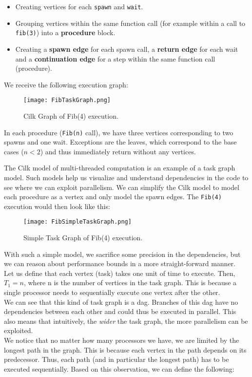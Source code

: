 \documentclass[main.tex]{subfiles}
\begin{document}
\begin{itemize}
  \item Creating vertices for each \texttt{spawn} and \texttt{wait}.
  \item Grouping vertices within the same function call (for example within a call to \texttt{fib(3)}) into a \textbf{procedure} block.
  \item Creating a \textbf{spawn edge} for each spawn call, a \textbf{return edge} for each wait and a \textbf{continuation edge} for a step within the same function call (procedure).
\end{itemize}

\noindent We receive the following execution graph:

\begin{figure}[H]
    \centering
    \texttt{[image: FibTaskGraph.png]}
    \caption{Cilk Graph of Fib(4) execution.}
\end{figure}

\noindent In each procedure (\texttt{Fib(n)} call), we have three vertices corresponding to two spawns and one wait. Exceptions are the leaves, which correspond to the base cases (\(n < 2\)) and thus immediately return without any vertices.

The Cilk model of multi-threaded computation is an example of a task graph model. Such models help us visualize and understand dependencies in the code to see where we can exploit parallelism. We can simplify the Cilk model to model each procedure as a vertex and only model the spawn edges. The \texttt{Fib(4)} execution would then look like this:

\begin{figure}[H]
    \centering
    \texttt{[image: FibSimpleTaskGraph.png]}
    \caption{Simple Task Graph of Fib(4) execution.}
\end{figure}

\noindent With such a simple model, we sacrifice some precision in the dependencies, but we can reason about performance bounds in a more straight-forward manner.\\
Let us define that each vertex (task) takes one unit of time to execute. Then, \(T_{1} = n\), where n is the number of vertices in the task graph. This is because a single processor needs to sequentially execute one vertex after the other.\\
We can see that this kind of task graph is a dag. Branches of this dag have no dependencies between each other and could thus be executed in parallel. This also means that intuitively, the \textit{wider} the task graph, the more parallelism can be exploited.\\[3mm]
We notice that no matter how many processors we have, we are limited by the longest path in the graph. This is because each vertex in the path depends on its predecessor. Thus, each path (and in particular the longest path) has to be executed sequentially. Based on this observation, we can define the following:
\end{document}
